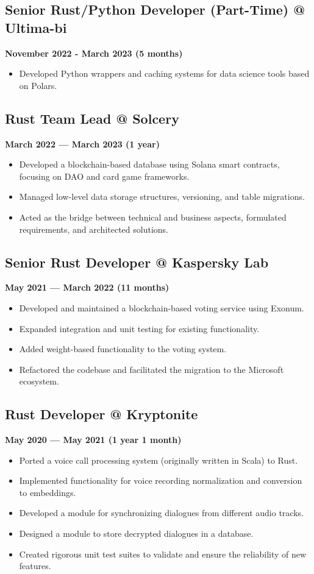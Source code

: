 \documentclass[a4paper,12pt]{article}
\begin{document}
\subsection*{Senior Rust/Python Developer (Part-Time) @ Ultima-bi}
\textbf{November 2022 - March 2023 (5 months)}
\begin{itemize}
    \item Developed Python wrappers and caching systems for data science tools based on Polars.
\end{itemize}

\subsection*{Rust Team Lead @ Solcery}
\textbf{March 2022 — March 2023 (1 year)}
\begin{itemize}
    \item Developed a blockchain-based database using Solana smart contracts, focusing on DAO and card game frameworks.
    \item Managed low-level data storage structures, versioning, and table migrations.
    \item Acted as the bridge between technical and business aspects, formulated requirements, and architected solutions.
\end{itemize}

\subsection*{Senior Rust Developer @ Kaspersky Lab}
\textbf{May 2021 — March 2022 (11 months)}
\begin{itemize}
    \item Developed and maintained a blockchain-based voting service using Exonum.
    \item Expanded integration and unit testing for existing functionality.
    \item Added weight-based functionality to the voting system.
    \item Refactored the codebase and facilitated the migration to the Microsoft ecosystem.
\end{itemize}

\subsection*{Rust Developer @ Kryptonite}
\textbf{May 2020 — May 2021 (1 year 1 month)}
\begin{itemize}
    \item Ported a voice call processing system (originally written in Scala) to Rust.
    \item Implemented functionality for voice recording normalization and conversion to embeddings.
    \item Developed a module for synchronizing dialogues from different audio tracks.
    \item Designed a module to store decrypted dialogues in a database.
    \item Created rigorous unit test suites to validate and ensure the reliability of new features.
\end{itemize}
\end{document}
